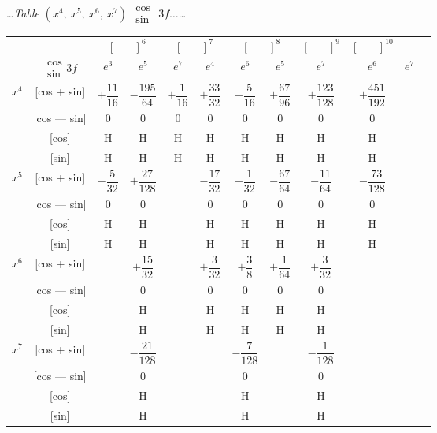 \documentclass[10pt,a4paper]{article}
\newcommand{\tabletitle}[2]{%
  \begin{center}
  \ldots\textit{Table} #1 $\displaystyle\begin{smallmatrix} \cos \\ \sin \end{smallmatrix}$ #2\ldots
  \end{center}
}
\begin{document}
\newpage
\tabletitle{$(x^4,\ x^5,\ x^6,\ x^7)$}{$3f\ldots$}

\begin{center}
\small
\begin{tabular}{|c|c|c|c|c|c|c|c|c|c|c|c|}
\hline
& & \multicolumn{2}{c|}{$[\phantom{()}]^6$} & \multicolumn{2}{c|}{$[\phantom{()}]^7$} & \multicolumn{2}{c|}{$[\phantom{()}]^8$} & \multicolumn{1}{c|}{$[\phantom{()}]^9$} & \multicolumn{1}{c|}{$[\phantom{()}]^{10}$} \\
\cline{3-10}
& $\begin{smallmatrix} \cos \\ \sin \end{smallmatrix} 3f$ & $e^3$ & $e^5$ & $e^7$ & $e^4$ & $e^6$ & $e^5$ & $e^7$ & $e^6$ & $e^7$ \\
\hline
\multirow{4}{*}{$x^4$} & [cos + sin] & $+\dfrac{11}{16}$ & $-\dfrac{195}{64}$ & $+\dfrac{1}{16}$ & $+\dfrac{33}{32}$ & $+\dfrac{5}{16}$ & $+\dfrac{67}{96}$ & $+\dfrac{123}{128}$ & $+\dfrac{451}{192}$ \\
& [cos --- sin] & $0$ & $0$ & $0$ & $0$ & $0$ & $0$ & $0$ & $0$ \\
& [cos] & H & H & H & H & H & H & H & H \\
& [sin] & H & H & H & H & H & H & H & H \\
\hline
\multirow{4}{*}{$x^5$} & [cos + sin] & $-\dfrac{5}{32}$ & $+\dfrac{27}{128}$ & & $-\dfrac{17}{32}$ & $-\dfrac{1}{32}$ & $-\dfrac{67}{64}$ & $-\dfrac{11}{64}$ & $-\dfrac{73}{128}$ \\
& [cos --- sin] & $0$ & $0$ & & $0$ & $0$ & $0$ & $0$ & $0$ \\
& [cos] & H & H & & H & H & H & H & H \\
& [sin] & H & H & & H & H & H & H & H \\
\hline
\multirow{4}{*}{$x^6$} & [cos + sin] & & $+\dfrac{15}{32}$ & & $+\dfrac{3}{32}$ & $+\dfrac{3}{8}$ & $+\dfrac{1}{64}$ & $+\dfrac{3}{32}$ \\
& [cos --- sin] & & $0$ & & $0$ & $0$ & $0$ & $0$ \\
& [cos] & & H & & H & H & H & H \\
& [sin] & & H & & H & H & H & H \\
\hline
\multirow{4}{*}{$x^7$} & [cos + sin] & & $-\dfrac{21}{128}$ & & & $-\dfrac{7}{128}$ & & $-\dfrac{1}{128}$ \\
& [cos --- sin] & & $0$ & & & $0$ & & $0$ \\
& [cos] & & H & & & H & & H \\
& [sin] & & H & & & H & & H \\
\hline
\end{tabular}
\end{center}
\end{document}
